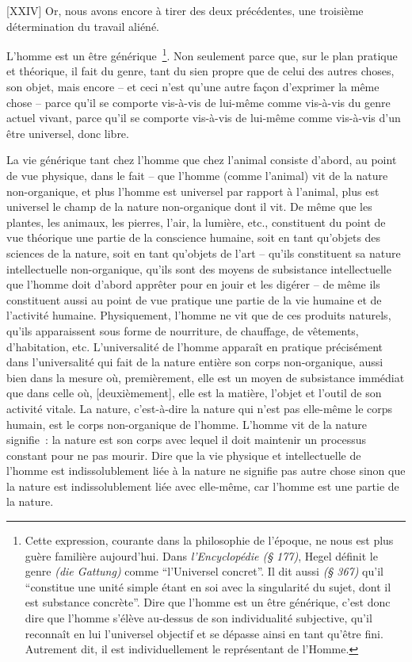 \documentclass[french,twoside]{book} %
\begin{document}
[XXIV] Or, nous avons encore à tirer des deux précédentes, une troisième détermination du travail aliéné.\par
L’homme est un être générique \footnote{Cette expression, courante dans la philosophie de l’époque, ne nous est plus guère familière aujourd’hui. Dans \emph{l’Encyclopédie (§ 177)}, Hegel définit le genre \emph{(die Gattung)} comme “l’Universel concret”. Il dit aussi \emph{(§ 367)} qu’il “constitue une unité simple étant en soi avec la singularité du sujet, dont il est substance concrète”. Dire que l’homme est un être générique, c’est donc dire que l’homme s’élève au-dessus de son individualité subjective, qu’il reconnaît en lui l’universel objectif et se dépasse ainsi en tant qu’être fini. Autrement dit, il est individuellement le représentant de l’Homme.}. Non seulement parce que, sur le plan pratique et théorique, il fait du genre, tant du sien propre que de celui des autres choses, son objet, mais encore – et ceci n’est qu’une autre façon d’exprimer la même chose – parce qu’il se comporte vis-à-vis de lui-même comme vis-à-vis du genre actuel vivant, parce qu’il se comporte vis-à-vis de lui-même comme vis-à-vis d’un être universel, donc libre.\par
La vie générique tant chez l’homme que chez l’animal consiste d’abord, au point de vue physique, dans le fait – que l’homme (comme l’animal) vit de la nature non-organique, et plus l’homme est universel par rapport à l’animal, plus est universel le champ de la nature non-organique dont il vit. De même que les plantes, les animaux, les pierres, l’air, la lumière, etc., constituent du point de vue théorique une partie de la conscience humaine, soit en tant qu’objets des sciences de la nature, soit en tant qu’objets de l’art – qu’ils constituent sa nature intellectuelle non-organique, qu’ils sont des moyens de subsistance intellectuelle que l’homme doit d’abord apprêter pour en jouir et les digérer – de même ils constituent aussi au point de vue pratique une partie de la vie humaine et de l’activité humaine. Physiquement, l’homme ne vit que de ces produits naturels, qu’ils apparaissent sous forme de nourriture, de chauffage, de vêtements, d’habitation, etc. L’universalité de l’homme apparaît en pratique précisément dans l’universalité qui fait de la nature entière son corps non-organique, aussi bien dans la mesure où, premièrement, elle est un moyen de subsistance immédiat que dans celle où, [deuxièmement], elle est la matière, l’objet et l’outil de son activité vitale. La nature, c’est-à-dire la nature qui n’est pas elle-même le corps humain, est le corps non-organique de l’homme. L’homme vit de la nature signifie : la nature est son corps avec lequel il doit maintenir un processus constant pour ne pas mourir. Dire que la vie physique et intellectuelle de l’homme est indissolublement liée à la nature ne signifie pas autre chose sinon que la nature est indissolublement liée avec elle-même, car l’homme est une partie de la nature.\par
\end{document}
